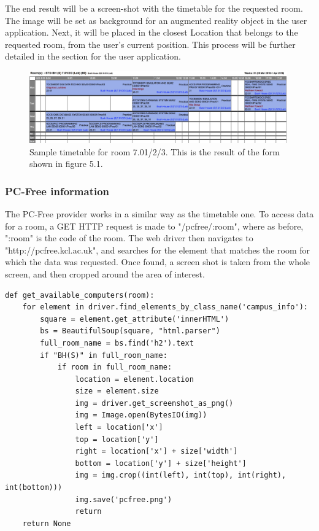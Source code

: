 The end result will be a screen-shot with the timetable for the requested room. The image will be set as background for an augmented reality object in the user application. Next, it will be placed in the closest Location that belongs to the requested room, from the user's current position. This process will be further detailed in the section for the user application.

\begin{figure}[H]
    \centering
    \includegraphics[width=420px, height=117px]{Implementation&Testing/timetable-701.png}
    \centering
    \caption{Sample timetable for room 7.01/2/3. This is the result of the form shown in figure 5.1.}
\end{figure}

\subsubsection*{PC-Free information}
The PC-Free provider works in a similar way as the timetable one. To access data for a room, a GET HTTP request is made to "/pcfree/:room", where as before, ":room" is the code of the room. The web driver then navigates to "http://pcfree.kcl.ac.uk", and searches for the element that matches the room for which the data was requested. Once found, a screen shot is taken from the whole screen, and then cropped around the area of interest.

\begin{lstlisting}
def get_available_computers(room):
    for element in driver.find_elements_by_class_name('campus_info'):
        square = element.get_attribute('innerHTML')
        bs = BeautifulSoup(square, "html.parser")
        full_room_name = bs.find('h2').text
        if "BH(S)" in full_room_name:
            if room in full_room_name:
                location = element.location
                size = element.size
                img = driver.get_screenshot_as_png()
                img = Image.open(BytesIO(img))
                left = location['x']
                top = location['y']
                right = location['x'] + size['width']
                bottom = location['y'] + size['height']
                img = img.crop((int(left), int(top), int(right), int(bottom)))
                img.save('pcfree.png')
                return
    return None
\end{lstlisting}

